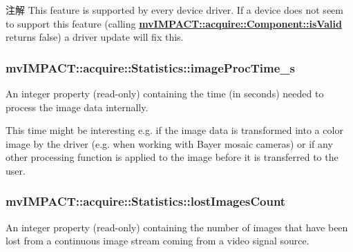 \begin{DoxyNote}{注解}
This feature is supported by every device driver. If a device does not seem to support this feature (calling {\bfseries \hyperlink{classmv_i_m_p_a_c_t_1_1acquire_1_1_component_ac51e55e7e046101f3c6119d84123abd5}{mv\+I\+M\+P\+A\+C\+T\+::acquire\+::\+Component\+::is\+Valid}} returns false) a driver update will fix this. 
\end{DoxyNote}
\hypertarget{classmv_i_m_p_a_c_t_1_1acquire_1_1_statistics_ac65c579e00cb51b5c841b6730631fe7e}{
\subsubsection[{image\+Proc\+Time\+\_\+s}]{ mv\+I\+M\+P\+A\+C\+T\+::acquire\+::\+Statistics\+::image\+Proc\+Time\+\_\+s}}\label{classmv_i_m_p_a_c_t_1_1acquire_1_1_statistics_ac65c579e00cb51b5c841b6730631fe7e}


An integer property {\bfseries }(read-\/only) containing the time (in seconds) needed to process the image data internally. 

This time might be interesting e.\+g. if the image data is transformed into a color image by the driver (e.\+g. when working with Bayer mosaic cameras) or if any other processing function is applied to the image before it is transferred to the user. \hypertarget{classmv_i_m_p_a_c_t_1_1acquire_1_1_statistics_abde1d07aa81d81e9c9a9825a2674fbcd}{
\subsubsection[{lost\+Images\+Count}]{ mv\+I\+M\+P\+A\+C\+T\+::acquire\+::\+Statistics\+::lost\+Images\+Count}}\label{classmv_i_m_p_a_c_t_1_1acquire_1_1_statistics_abde1d07aa81d81e9c9a9825a2674fbcd}


An integer property {\bfseries }(read-\/only) containing the number of images that have been lost from a continuous image stream coming from a video signal source. 

